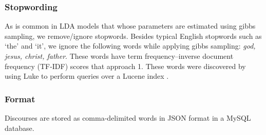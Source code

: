 \subsubsection{Stopwording}
As is common in LDA models that whose parameters are estimated using gibbs sampling, we remove/ignore stopwords. Besides typical English stopwords such as `the' and `it', we ignore the following words while applying gibbs sampling: \textit{god, jesus, christ, father}. These words have term frequency--inverse document frequency (TF-IDF) \cite{wiki:tf-idf} scores that approach 1. These words were discovered by using Luke to perform queries over a Lucene index \cite{lucene:luke}.

\subsubsection{Format}
Discourses are stored as comma-delimited words in JSON format in a MySQL database. %



